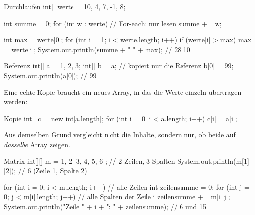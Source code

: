 \beispiele
{}
\begin{javacode}[Ausschnitt]{Durchlaufen}
int[] werte = {10, 4, 7, -1, 8};

int summe = 0;
for (int w : werte) {               // For-each: nur lesen
	summe += w;
}

int max = werte[0];
for (int i = 1; i < werte.length; i++) {
	if (werte[i] > max) {
		max = werte[i];
	}
}
System.out.println(summe + " " + max);      // 28 10
\end{javacode}

\noindent\begin{minipage}[c]{0.5\linewidth}
\begin{javacode}[Ausschnitt]{Referenz}
int[] a = {1, 2, 3};
int[] b = a;          // kopiert nur die Referenz
b[0] = 99;
System.out.println(a[0]);     // 99
\end{javacode}
\end{minipage}\hfill
\begin{minipage}[c]{0.45\linewidth}
\centering
{}
\end{minipage}

\smallskip
Eine echte Kopie braucht ein neues Array, in das die Werte einzeln übertragen werden:
\begin{javacode}[Ausschnitt]{Kopie}
int[] c = new int[a.length];
for (int i = 0; i < a.length; i++) {
	c[i] = a[i];
}
\end{javacode}
Aus demselben Grund vergleicht  nicht die Inhalte, sondern nur, ob beide auf \emph{dasselbe} Array zeigen.

\begin{javacode}[Ausschnitt]{Matrix}
int[][] m = { {1, 2, 3}, {4, 5, 6} };       // 2 Zeilen, 3 Spalten
System.out.println(m[1][2]);                // 6 (Zeile 1, Spalte 2)

for (int i = 0; i < m.length; i++) {        // alle Zeilen
	int zeilensumme = 0;
	for (int j = 0; j < m[i].length; j++) { // alle Spalten der Zeile i
		zeilensumme += m[i][j];
	}
	System.out.println("Zeile " + i + ": " + zeilensumme);      // 6 und 15
}
\end{javacode}

